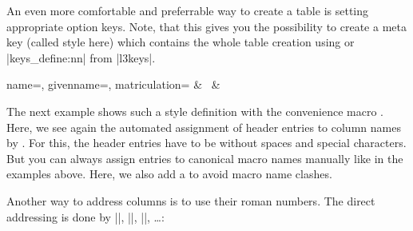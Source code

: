\documentclass[a4paper,11pt]{ltxdoc}
\begin{document}
\smallskip
An even more comfortable and preferrable way to create a table is setting
appropriate option keys. Note, that this gives you the possibility to create a
meta key (called style here) which contains the whole table creation
using  or |keys_define:nn| from |l3keys|.

\begin{dispExample}
  {name=\name, givenname=\firstname, matriculation=\matnumber}{%
    \thecsvrow & \firstname~\name & \matnumber
  }%
\end{dispExample}


\clearpage
The next example shows such a style definition with the convenience macro
. Here, we see again the automated assignment of header
entries to column names by .
For this, the header entries have to be without spaces and special characters.
But you can always assign entries to canonical macro names manually like in the examples
above. Here, we also add a  to avoid
macro name clashes.

\begin{dispExample}

\end{dispExample}


\smallskip
Another way to address columns is to use their roman numbers.
The direct addressing is done by |\csvcoli|, |\csvcolii|, |\csvcoliii|, \ldots:

\begin{dispExample}
\end{dispExample}
\end{document}
